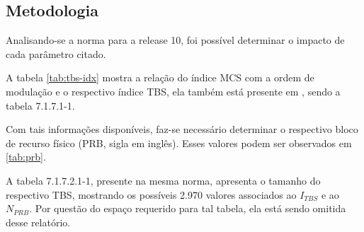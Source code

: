 \documentclass[journal,11pt,twocolumn]{IEEEtran}
\begin{document}
\subsection{Metodologia}

Analisando-se a norma \cite{lte} para a release 10, foi possível determinar o impacto de cada parâmetro citado.

A tabela \ref{tab:tbs-idx} mostra a relação do índice MCS com a ordem de modulação e o respectivo índice TBS, ela também está presente em \cite{lte}, sendo a tabela 7.1.7.1-1.

Com tais informações disponíveis, faz-se necessário determinar o respectivo bloco de recurso físico (PRB, sigla em inglês). Esses valores podem ser observados em \ref{tab:prb}.

A tabela 7.1.7.2.1-1, presente na mesma norma, apresenta o tamanho do respectivo TBS, mostrando os possíveis 2.970 valores associados ao $I_{TBS}$ e ao $N_{PRB}$. Por questão do espaço requerido para tal tabela, ela está sendo omitida desse relatório.
\end{document}
